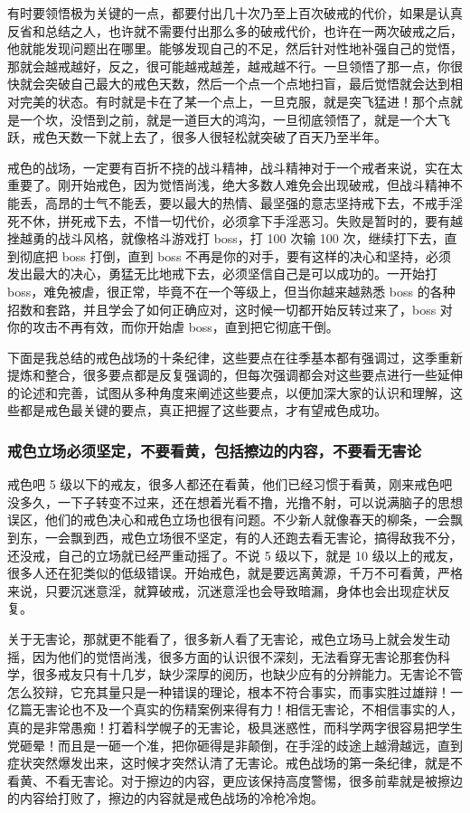 有时要领悟极为关键的一点，都要付出几十次乃至上百次破戒的代价，如果是认真反省和总结之人，也许就不需要付出那么多的破戒代价，也许在一两次破戒之后，他就能发现问题出在哪里。能够发现自己的不足，然后针对性地补强自己的觉悟，那就会越戒越好，反之，很可能越戒越差，越戒越不行。一旦领悟了那一点，你很快就会突破自己最大的戒色天数，然后一个点一个点地扫盲，最后觉悟就会达到相对完美的状态。有时就是卡在了某一个点上，一旦克服，就是突飞猛进！那个点就是一个坎，没悟到之前，就是一道巨大的鸿沟，一旦彻底领悟了，就是一个大飞跃，戒色天数一下就上去了，很多人很轻松就突破了百天乃至半年。

戒色的战场，一定要有百折不挠的战斗精神，战斗精神对于一个戒者来说，实在太重要了。刚开始戒色，因为觉悟尚浅，绝大多数人难免会出现破戒，但战斗精神不能丢，高昂的士气不能丢，要以最大的热情、最坚强的意志坚持戒下去，不戒手淫死不休，拼死戒下去，不惜一切代价，必须拿下手淫恶习。失败是暂时的，要有越挫越勇的战斗风格，就像格斗游戏打 boss，打 100 次输 100 次，继续打下去，直到彻底把 boss 打倒，直到 boss 不再是你的对手，要有这样的决心和坚持，必须发出最大的决心，勇猛无比地戒下去，必须坚信自己是可以成功的。一开始打 boss，难免被虐，很正常，毕竟不在一个等级上，但当你越来越熟悉 boss 的各种招数和套路，并且学会了如何正确应对，这时候一切都开始反转过来了，boss 对你的攻击不再有效，而你开始虐 boss，直到把它彻底干倒。

下面是我总结的戒色战场的十条纪律，这些要点在往季基本都有强调过，这季重新提炼和整合，很多要点都是反复强调的，但每次强调都会对这些要点进行一些延伸的论述和完善，试图从多种角度来阐述这些要点，以便加深大家的认识和理解，这些都是戒色最关键的要点，真正把握了这些要点，才有望戒色成功。

\subsubsection{戒色立场必须坚定，不要看黄，包括擦边的内容，不要看无害论}

戒色吧 5 级以下的戒友，很多人都还在看黄，他们已经习惯于看黄，刚来戒色吧没多久，一下子转变不过来，还在想着光看不撸，光撸不射，可以说满脑子的思想误区，他们的戒色决心和戒色立场也很有问题。不少新人就像春天的柳条，一会飘到东，一会飘到西，戒色立场很不坚定，有的人还跑去看无害论，搞得敌我不分，还没戒，自己的立场就已经严重动摇了。不说 5 级以下，就是 10 级以上的戒友，很多人还在犯类似的低级错误。开始戒色，就是要远离黄源，千万不可看黄，严格来说，只要沉迷意淫，就算破戒，沉迷意淫也会导致暗漏，身体也会出现症状反复。

关于无害论，那就更不能看了，很多新人看了无害论，戒色立场马上就会发生动摇，因为他们的觉悟尚浅，很多方面的认识很不深刻，无法看穿无害论那套伪科学，很多戒友只有十几岁，缺少深厚的阅历，也缺少应有的分辨能力。无害论不管怎么狡辩，它充其量只是一种错误的理论，根本不符合事实，而事实胜过雄辩！一亿篇无害论也不及一个真实的伤精案例来得有力！相信无害论，不相信事实的人，真的是非常愚痴！打着科学幌子的无害论，极具迷惑性，而科学两字很容易把学生党砸晕！而且是一砸一个准，把你砸得是非颠倒，在手淫的歧途上越滑越远，直到症状突然爆发出来，这时候才突然认清了无害论。戒色战场的第一条纪律，就是不看黄、不看无害论。对于擦边的内容，更应该保持高度警惕，很多前辈就是被擦边的内容给打败了，擦边的内容就是戒色战场的冷枪冷炮。

